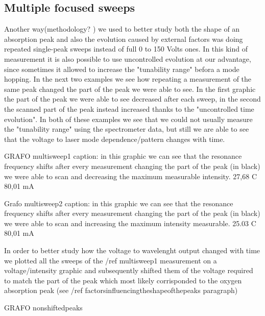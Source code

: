 		\subsection{Multiple focused sweeps}\label{focus}
Another way(methodology? ) we used to better study both the shape of an absorption peak and also the evolution caused by external factors was doing repeated single-peak sweeps instead of 
full 0 to 150 Volts ones. In  this kind of measurement it is also possible to use uncontrolled evolution at our advantage, since sometimes it allowed 
to increase the "tunability range" befora a mode hopping. 
In the next two examples we see how repeating a measurement of the same peak changed the part of the peak we were able to see. In the first graphic the part of the peak
we were able to see decreased after each sweep, in the second the scanned part of the peak instead increased thanks to the "uncontrolled time evolution".
In both of these examples we see that we could not usually measure the "tunability range" using the spectrometer data, but still we are able to see that 
the voltage to laser mode dependence/pattern changes with time. 


GRAFO multisweep1
caption: in this graphic we can see that the resonance frequency shifts after every measurement changing the part of the peak (in black) we were able to scan and decreasing the maximum measurable intensity.
27,68 C         80,01  mA

Grafo multisweep2
caption: in this graphic we can see that the resonance frequency shifts after every measurement changing the part of the peak (in black) we were able to scan and increasing the maximum intensity measurable.
25.03 C         80,01  mA


In order to better study how the voltage to wavelenght output changed with time we plotted all the sweeps of the /ref multisweep1 measurement on a
voltage/intensity graphic and subsequently shifted them of the voltage required to match the part of the peak which most likely corrisponded to the oxygen absorption 
peak (see /ref factorsinfluencingtheshapeofthepeaks paragraph) 

GRAFO nonshiftedpeaks

